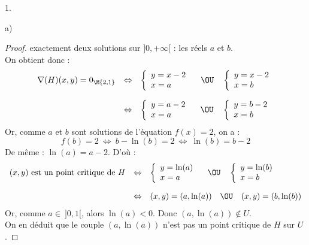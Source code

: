 \begin{noliste}{1.}
\begin{noliste}{a)}
\begin{proof}
      exactement deux solutions sur $]0,+\infty[$ : les réels
      $a$ et $b$.\\
      On obtient donc :
      \[
       \begin{array}{rcl}
        \nabla(H)(x,y)=0_{\M{2,1}} & \Leftrightarrow &
        \left\{
        \begin{array}{l}
          y = x-2\\
          x = a
        \end{array}
        \right.
        \quad \OU \quad 
        \left\{
        \begin{array}{l}
          y = x-2\\
          x = b
        \end{array}
        \right.
        \\[.6cm]
        & \Leftrightarrow &
        \left\{
        \begin{array}{l}
          y = a-2\\
          x = a
        \end{array}
        \right.
        \quad \OU \quad 
        \left\{
        \begin{array}{l}
          y = b-2\\
          x = b
        \end{array}
        \right.
       \end{array}
      \]
      Or, comme $a$ et $b$ sont solutions de l'équation $f(x)=2$, on a :
      \[
        f(b)=2 \ \Leftrightarrow \ b-\ln(b)=2 \ \Leftrightarrow \
        \ln(b)=b-2
      \]
      De même : $\ln(a)=a-2$. D'où :
      \[
       \begin{array}{rcl}
        \text{$(x,y)$ est un point critique de $H$} & \Leftrightarrow &
        \left\{
        \begin{array}{l}
          y = \ln(a)\\
          x = a
        \end{array}
        \right.
        \quad \OU \quad 
        \left\{
        \begin{array}{l}
          y = \ln(b)\\
          x = b
        \end{array}
        \right.
        \\[.6cm]
        & \Leftrightarrow & 
        (x,y)=(a,\ln(a)) \quad \OU \quad (x,y)=(b,\ln(b))
       \end{array}
      \]
      Or, comme $a \in \ ]0,1[$, alors $\ln(a) <0$. Donc 
      $(a, \ln(a)) \notin U$.\\
      On en déduit que le couple $(a,\ln(a))$ n'est pas un point 
      critique de $H$ sur $U$.
      

\end{proof}
\end{noliste}
\end{noliste}
